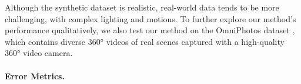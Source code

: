 Although the synthetic dataset is  realistic, real-world data tends to be more challenging, with complex lighting and motions.
%
To further explore our method's performance qualitatively, we also test our method on the OmniPhotos dataset \cite{BerteYLR2020}, which contains diverse 360° videos of real scenes captured with a high-quality 360° video camera.


\paragraph{Error Metrics.}

